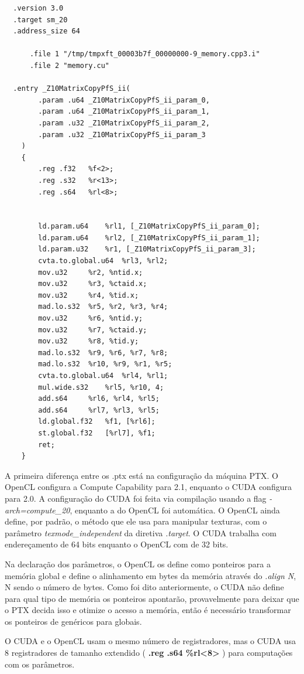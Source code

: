 \begin{lstlisting}
  .version 3.0
  .target sm_20
  .address_size 64

	  .file	1 "/tmp/tmpxft_00003b7f_00000000-9_memory.cpp3.i"
	  .file	2 "memory.cu"

  .entry _Z10MatrixCopyPfS_ii(
	    .param .u64 _Z10MatrixCopyPfS_ii_param_0,
	    .param .u64 _Z10MatrixCopyPfS_ii_param_1,
	    .param .u32 _Z10MatrixCopyPfS_ii_param_2,
	    .param .u32 _Z10MatrixCopyPfS_ii_param_3
    )
    {
	    .reg .f32 	%f<2>;
	    .reg .s32 	%r<13>;
	    .reg .s64 	%rl<8>;


	    ld.param.u64 	%rl1, [_Z10MatrixCopyPfS_ii_param_0];
	    ld.param.u64 	%rl2, [_Z10MatrixCopyPfS_ii_param_1];
	    ld.param.u32 	%r1, [_Z10MatrixCopyPfS_ii_param_3];
	    cvta.to.global.u64 	%rl3, %rl2;
	    mov.u32 	%r2, %ntid.x;
	    mov.u32 	%r3, %ctaid.x;
	    mov.u32 	%r4, %tid.x;
	    mad.lo.s32 	%r5, %r2, %r3, %r4;
	    mov.u32 	%r6, %ntid.y;
	    mov.u32 	%r7, %ctaid.y;
	    mov.u32 	%r8, %tid.y;
	    mad.lo.s32 	%r9, %r6, %r7, %r8;
	    mad.lo.s32 	%r10, %r9, %r1, %r5;
	    cvta.to.global.u64 	%rl4, %rl1;
	    mul.wide.s32 	%rl5, %r10, 4;
	    add.s64 	%rl6, %rl4, %rl5;
	    add.s64 	%rl7, %rl3, %rl5;
	    ld.global.f32 	%f1, [%rl6];
	    st.global.f32 	[%rl7], %f1;
	    ret;
    }
\end{lstlisting}

A primeira diferença entre os .ptx está na configuração da máquina PTX. O OpenCL configura a Compute Capability para 2.1, enquanto
o CUDA configura para 2.0. A configuração do CUDA foi feita via compilação usando a flag \textit{-arch=compute\_20}, enquanto a do
OpenCL foi automática. O OpenCL ainda define, por padrão, o método que ele usa para manipular texturas, com o parâmetro 
\textit{texmode\_independent} da diretiva \textit{.target}. O CUDA trabalha com endereçamento de 64 bits enquanto o OpenCL com de
32 bits.

Na declaração dos parâmetros, o OpenCL os define como ponteiros para a memória global e define o alinhamento em bytes da memória
através do \textit{.align N}, N sendo o número de bytes. Como foi dito anteriormente, o CUDA não define para qual tipo de memória
os ponteiros apontarão, provavelmente para deixar que o PTX decida isso e otimize o acesso a memória, então é necessário
transformar os ponteiros de genéricos para globais.

O CUDA e o OpenCL usam o mesmo número de registradores, mas o CUDA usa 8 registradores de tamanho extendido ( \textbf{.reg .s64 \%rl<8>} )
para computações com os parâmetros.

